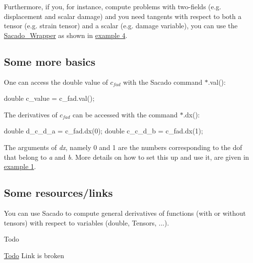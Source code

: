 Furthermore, if you, for instance, compute problems with two-\/fields (e.\+g. displacement and scalar damage) and you need tangents with respect to both a tensor (e.\+g. strain tensor) and a scalar (e.\+g. damage variable), you can use the \hyperlink{namespaceSacado__Wrapper}{Sacado\+\_\+\+Wrapper} as shown in \hyperlink{index_Ex4}{example 4}.\hypertarget{index_subsec_more_basics}{}\subsection{Some more basics}\label{index_subsec_more_basics}
One can access the double value of $ c_{fad} $ with the Sacado command $\ast$.val()\+: 
\begin{DoxyCode}
\textcolor{keywordtype}{double} c\_value = c\_fad.val();
\end{DoxyCode}
 The derivatives of $ c_{fad} $ can be accessed with the command $\ast$.dx()\+: 
\begin{DoxyCode}
\textcolor{keywordtype}{double} d\_c\_d\_a = c\_fad.dx(0);
\textcolor{keywordtype}{double} c\_c\_d\_b = c\_fad.dx(1);
\end{DoxyCode}
 The arguments of {\itshape dx}, namely 0 and 1 are the numbers corresponding to the dof that belong to {\itshape a} and {\itshape b}. More details on how to set this up and use it, are given in \hyperlink{index_Ex1}{example 1}.\hypertarget{index_subsec_resources}{}\subsection{Some resources/links}\label{index_subsec_resources}
You can use Sacado to compute general derivatives of functions (with or without tensors) with respect to variables (double, Tensors, ...). \begin{DoxyRefDesc}{Todo}
\item[\hyperlink{todo__todo000001}{Todo}]Link is broken\end{DoxyRefDesc}



